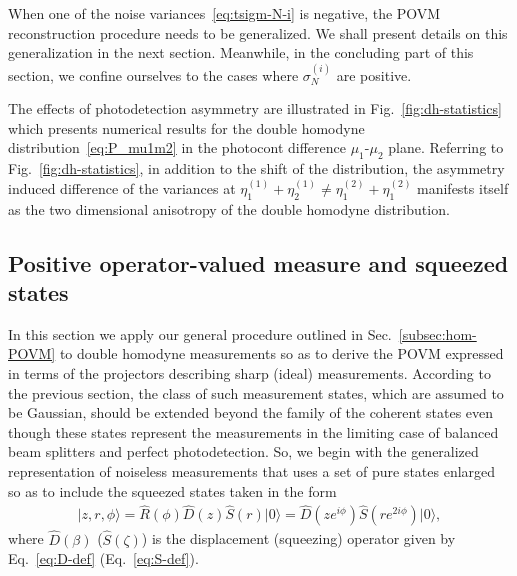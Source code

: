 \documentclass[%
reprint,
superscriptaddress,
 amsmath,amssymb,amsfonts,
 aps,
 pra,
 longbibliography
]{revtex4-2}
\newcommand{\ket}[1]{\ensuremath{|{#1}\rangle}}
\begin{document}
When one of the noise variances~\eqref{eq:tsigm-N-i} is negative,
the POVM reconstruction procedure needs to be generalized.
We shall present details on this generalization in the next section.
Meanwhile,
in the concluding part of this section,
we confine ourselves to the cases where $\sigma_N^{(i)}$ are positive.

The effects of photodetection asymmetry
are illustrated in Fig.~\ref{fig:dh-statistics}
which presents numerical results for
the double homodyne distribution~\eqref{eq:P_mu1m2}
in the photocont difference $\mu_1$-$\mu_2$ plane.
Referring to Fig.~\ref{fig:dh-statistics},
in addition to the shift of the distribution,
the asymmetry induced difference of the variances
at $\eta_1^{(1)}+\eta_2^{(1)}\ne \eta_1^{(2)}+\eta_1^{(2)}$
manifests itself as the two dimensional anisotropy
of the double homodyne distribution.

\subsection{Positive operator-valued measure and squeezed states}
\label{subsec:gen-POVM}

In this section we apply our general procedure outlined
in
Sec.~\ref{subsec:hom-POVM} to
double homodyne measurements so as to derive the POVM expressed in
terms of the projectors describing sharp (ideal)
measurements. According to the previous section, the class of such
measurement states, which are assumed to be Gaussian, should be
extended beyond the family of the coherent states even though these
states represent the measurements in the limiting case of balanced beam splitters and perfect
photodetection.
So, we begin with  the generalized representation of
noiseless measurements
that uses a set of
pure states enlarged so as to include the squeezed states
taken in the form
\begin{align}
  \label{eq:squeezed-def}
  \ket{z,r,\phi}=\hat{R}(\phi)\hat{D}(z)\hat{S}(r)\ket{0}=
  \hat{D}(z e^{i\phi})\hat{S}(r e ^{2i\phi})\ket{0},
\end{align}
where $\hat{D}(\beta)$ ($\hat{S}(\zeta)$) is the displacement
(squeezing) operator  given by
Eq.~\eqref{eq:D-def}
(Eq.~\eqref{eq:S-def}).
\end{document}
